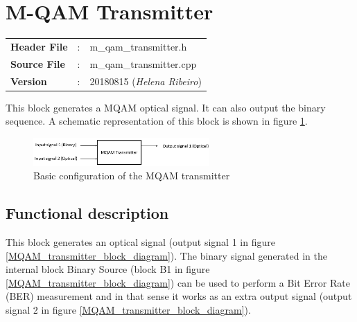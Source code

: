 \clearpage

\section{M-QAM Transmitter}

\begin{tcolorbox}	
	\begin{tabular}{p{2.75cm} p{0.2cm} p{10.5cm}} 	
		\textbf{Header File}   &:& m\_qam\_transmitter.h \\
		\textbf{Source File}   &:& m\_qam\_transmitter.cpp \\
        \textbf{Version}       &:& 20180815 (\emph{Helena Ribeiro})\\
	\end{tabular}
\end{tcolorbox}

This block generates a MQAM optical signal. It can also output the binary sequence. A schematic representation of this block is shown in figure \ref{MQAM_transmitter_block_diagram_simple}.

\begin{figure}[h]
	\centering
	\includegraphics[width=0.6\textwidth]{./lib/m_qam_transmitter/figures/MQAM_transmitter_block_diagram_simple}
	\caption{Basic configuration of the MQAM transmitter}\label{MQAM_transmitter_block_diagram_simple}
\end{figure}

\subsection*{Functional description}

This block generates an optical signal (output signal 1 in figure \ref{MQAM_transmitter_block_diagram}). The binary signal generated in the internal block Binary Source (block B1 in figure \ref{MQAM_transmitter_block_diagram}) can be used to perform a Bit Error Rate (BER) measurement and in that sense it works as an extra output signal (output signal 2 in figure \ref{MQAM_transmitter_block_diagram}).

